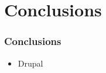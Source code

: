 \section{Conclusions}
\begin{frame}[allowframebreaks]
\frametitle{Conclusions}

\begin{itemize}
	\item Drupal
\end{itemize}
\end{frame}

